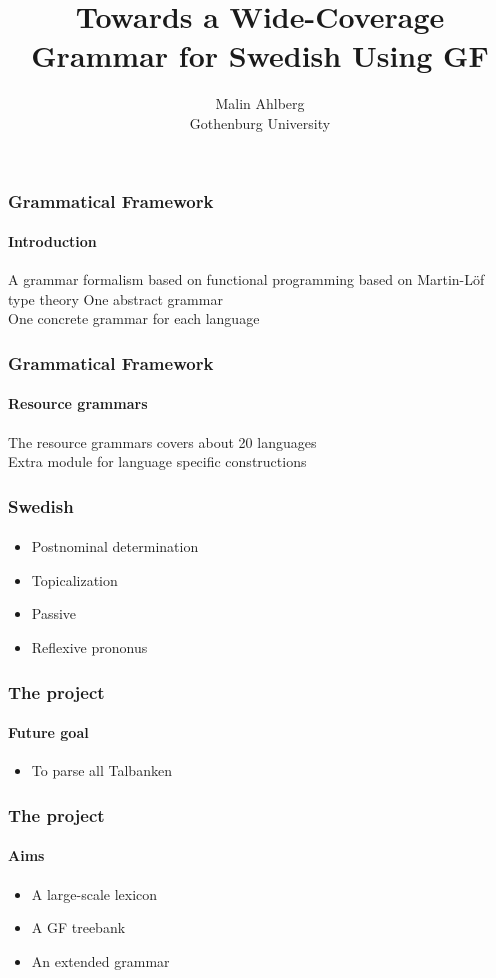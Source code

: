 \documentclass[10pt]{beamer}
\title{Towards a Wide-Coverage Grammar for Swedish Using GF}
\author{Malin Ahlberg \\ Gothenburg University}
\date{}
\begin{document}
\maketitle

 \begin{frame}
  \frametitle{Grammatical Framework}
  \framesubtitle{Introduction}
  A grammar formalism based on functional programming 
  based on Martin-Löf type theory
  \vspace{5mm}
  \pause
  One abstract grammar \\
  \pause
  One concrete grammar for each language \\
 \end{frame}

 \begin{frame}
  \frametitle{Grammatical Framework}
  \framesubtitle{Resource grammars}
  The resource grammars covers about 20 languages \\
  \vspace{5mm}
  \pause
  Extra module for language specific constructions
 \end{frame}

\begin{frame}
\frametitle{Swedish}
\framesubtitle{} 
\begin{itemize}
\item{Postnominal determination}
\item{Topicalization}
\item{Passive}
\item{Reflexive prononus}
\end{itemize}
\end{frame}

\begin{frame}
\frametitle{The project}
\framesubtitle{Future goal} 
\begin{itemize}
\item{To parse all Talbanken}
\end{itemize}
\end{frame}



\begin{frame}
\frametitle{The project}
\framesubtitle{Aims} 
\begin{itemize}
\item{A large-scale lexicon}
\item{A GF treebank}
\item{An extended grammar}
\end{itemize}
\end{frame}
\end{document}
